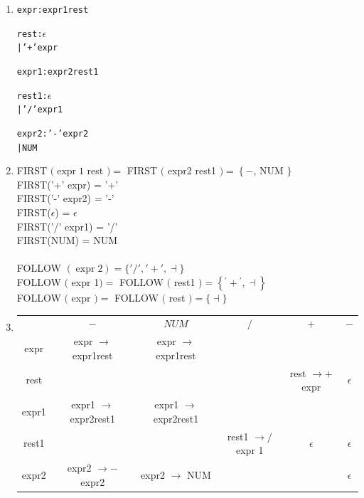 \documentclass[a4paper]{exam}
\begin{document}
\begin{solution}
\begin{enumerate}
    \item \begin{multicols}{3}
        \begin{alltt}
        expr : expr1 rest
        
        rest : \(\epsilon\)
             | '+' expr
        
        expr1 : expr2 rest1
        
        rest1 : \(\epsilon\)
              | '/' expr1
        
        expr2 : '-' expr2
              | NUM
        \end{alltt}
    \end{multicols}
    \item FIRST $(\operatorname{expr} 1$ rest $)=$ FIRST $($ expr2 rest1 $)=\left\{-\right.$, NUM $\}$
    \\
    
    FIRST(’+’ expr) = { ’+’ }\\
    FIRST(’-’ expr2) = { ’-’ }\\
    FIRST($\epsilon$) = { $\epsilon$ }\\
    FIRST(’/’ expr1) = { ’/’ }\\
    FIRST(NUM) = { NUM }\\
    
\\
FOLLOW $(\operatorname{expr} 2)=\{ '/', '+', \dashv \}$\\
FOLLOW $($ expr 1$)=$ FOLLOW $($ rest1 $)=\left\{{ }^{\prime}+{ }^{\prime}, \dashv\right\}$\\
FOLLOW $($ expr $)=$ FOLLOW $($ rest $)=\{\dashv\}$\\
\item \begin{tabular}{|c|ccccc|}
\hline & $-$ & $N U M$ & $/$ & $+$ & $-$ \\
expr & expr $\rightarrow$ expr1rest & expr $\rightarrow$ expr1rest & & & \\
rest & & & & rest $\rightarrow+$ expr & $\epsilon$ \\
expr1 & expr1 $\rightarrow$ expr2rest1 & expr1 $\rightarrow$ expr2rest1 & & & \\
rest1 & & & rest1 $\rightarrow /$ expr 1 & $\epsilon$ & $\epsilon$ \\
expr2 & expr2 $\rightarrow-$ expr2 & expr2 $\rightarrow$ NUM & & & $\epsilon$ \\
\hline
\end{tabular}
\end{enumerate}
\end{solution}
\end{document}

